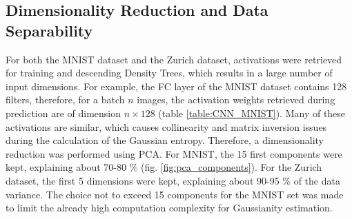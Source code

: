 \documentclass[10pt]{article}
\begin{document}
\subsection{Dimensionality Reduction and Data Separability}
\label{subsec:methodology-dim-reduction}
For both the MNIST dataset and the Zurich dataset, activations were retrieved for training and descending Density Trees, which results in a large number of input dimensions. For example, the \gls{FC} layer of the MNIST dataset contains 128 filters, therefore, for a batch $n$ images, the activation weights retrieved during prediction are of dimension $n \times 128$ (table \ref{table:CNN_MNIST}). Many of these activations are similar, which causes collinearity and matrix inversion issues during the calculation of the Gaussian entropy. Therefore, a dimensionality reduction was performed using \gls{PCA}. For MNIST, the 15 first components were kept, explaining about 70-80 \% (fig. \ref{fig:pca_components}). For the Zurich dataset, the first 5 dimensions were kept, explaining about 90-95 \% of the data variance. The choice not to exceed 15 components for the MNIST set was made to limit the already high computation complexity for Gaussianity estimation. \\
\end{document}
